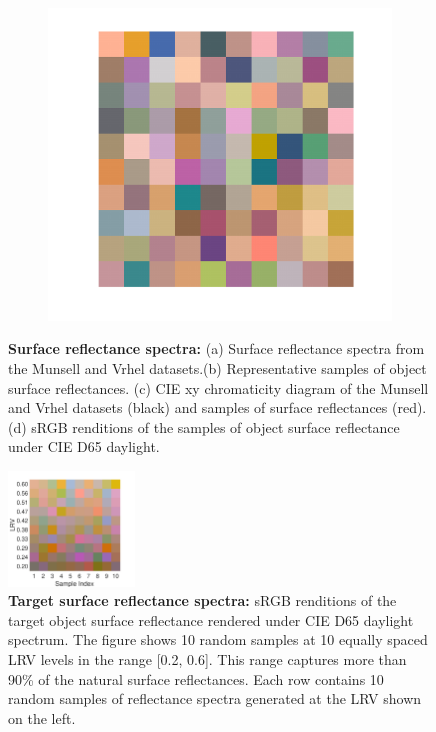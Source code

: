 \documentclass{jov}
\begin{document}
\begin{figure}
\begin{subfigure}{0.24 \textwidth}
    \end{subfigure}    
    \centering
	\begin{subfigure}{0.24 \textwidth}
    \centering
        \caption{}
        \includegraphics[width=\textwidth]{../FiguresDraft4/Figure7/Figure7_d.pdf}
        \label{fig:backgroundSwatches}
    \end{subfigure}
    \caption{{\bf Surface reflectance spectra:} (a) Surface reflectance spectra from the Munsell and Vrhel datasets.(b) Representative samples of object surface reflectances. (c) CIE xy chromaticity diagram of the Munsell and Vrhel datasets (black) and samples of surface reflectances (red). (d) sRGB renditions of the samples of object surface reflectance under CIE D65 daylight.}
\label{fig:surfaceReflectanceGeneration}
\end{figure}

\begin{figure}
\centering
\includegraphics[width=0.3\textwidth]{../FiguresDraft4/Figure8/Figure8.pdf}
\caption{{\bf Target surface reflectance spectra:} sRGB renditions of the target object surface reflectance rendered under CIE D65 daylight spectrum. The figure shows 10 random samples at 10 equally spaced LRV levels in the range [0.2, 0.6]. This range captures more than 90\% of the natural surface reflectances. Each row contains 10 random samples of reflectance spectra generated at the LRV shown on the left.}
\label{fig:targetSwatches}
\end{figure}
\end{document}
